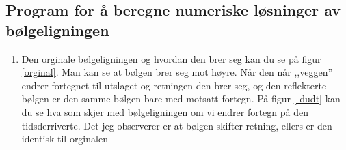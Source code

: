 \documentclass[a4paper,12pt,norsk]{article}
\begin{document}
\subsection{Program for å beregne numeriske løsninger av bølgeligningen}
\begin{enumerate}[label=(\alph*)]
\begin{figure}
	\begin{minipage}{.5\linewidth}
	\texttt{[image: orginal.png]} 
	\caption[Hvordan bølgen brer seg originalt]{Hvordan bølgen brer seg uten noen endringer. 
	Observerer at når bølgen treffer ,,veggen'' blir utslaget og retningen motsatt av hva den startet 
	med}
	\label{orginal}
	\end{minipage}
	\hspace{.5cm}
	\begin{minipage}{.5\linewidth}
	\texttt{[image: -dudt.png]} 
	\caption[Hvordan bølgen brer seg, $-\frac{du}{dt}$]{Her ser vi at om den tidsderiverte $\dot{u}$ 
	er motsatt rettet så endrer også retningen bølgen starter å brer seg}
	\label{-dudt}
	\end{minipage}
	\hspace{.5cm}
	\begin{minipage}{.5\linewidth}
	\texttt{[image: 05dudt.png]} 
	\caption[Hvordan bølgen brer seg, $0.5\frac{du}{dt}$]{Her ser man at bølgen deler seg å brer 
	seg i begge retninger av start bølgen. Man kan se etter $3\Delta t$ at når bølgene treffer 
	hverandre igjen blir utslaget mindre enn originalt}
	\label{05dudt}
	\end{minipage}
	\hspace{.5cm}
	\begin{minipage}{.5\linewidth}
	\texttt{[image: 2dudt.png]} 
	\caption[Hvordan bølgen brer seg, $2\frac{du}{dt}$]{Også her ser man at bølgen deler seg å 
	brer seg i begge retninger av start bølgen. Hvis vi ser på bølgen etter $3\Delta t$ at når 
	bølgene treffer hverandre igjen blir utslaget større enn originalt}
	\label{2dudt}
	\end{minipage}
\end{figure}
\item
Den orginale bølgeligningen og hvordan den brer seg kan du se på figur \vref{orginal}. Man kan se at bølgen brer seg mot høyre. Når den når ,,veggen'' endrer fortegnet til utslaget og retningen den brer seg, og den reflekterte bølgen er den samme bølgen bare med motsatt fortegn. 
På figur \vref{-dudt} kan du se hva som skjer med bølgeligningen om vi endrer fortegn på den tidsderriverte. Det jeg observerer er at  bølgen skifter retning, ellers er den identisk til orginalen


\end{enumerate}
\end{document}
